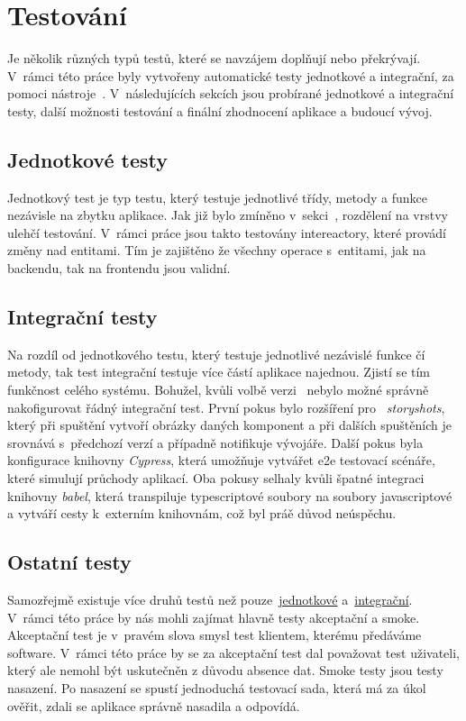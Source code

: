 \chapter{Testování}
\label{ch:testing}
Je několik různých typů testů, které se navzájem doplňují nebo překrývají. V~rámci této práce byly vytvořeny automatické testy jednotkové a integrační, za pomoci nástroje~. V~následujících sekcích jsou probírané jednotkové a integrační testy, další možnosti testování a finální zhodnocení aplikace a budoucí vývoj.

\section{Jednotkové testy}
\label{sc:unit_tests}
Jednotkový test je typ testu, který testuje jednotlivé třídy, metody a funkce nezávisle na zbytku aplikace. Jak již bylo zmíněno v~sekci~, rozdělení na vrstvy ulehčí testování. V~rámci práce jsou takto testovány intereactory, které provádí změny nad entitami. Tím je zajištěno že všechny operace s~entitami, jak na backendu, tak na frontendu jsou validní.

\section{Integrační testy}
\label{sc:integration_tests}
Na rozdíl od jednotkového testu, který testuje jednotlivé nezávislé funkce čí metody, tak test integrační testuje více částí aplikace najednou. Zjistí se tím funkčnost celého systému. Bohužel, kvůli volbě verzi~ nebylo možné správně nakofigurovat řádný integrační test. První pokus bylo rozšíření pro~ \emph{storyshots}, který při spuštění vytvoří obrázky daných komponent a při dalších spuštěních je srovnává s~předchozí verzí a případně notifikuje vývojáře. Další pokus byla konfigurace knihovny \emph{Cypress}, která umožňuje vytvářet \acrfull{e2e} testovací scénáře, které simulují průchody aplikací. Oba pokusy selhaly kvůli špatné integraci knihovny \emph{babel}, která transpiluje typescriptové soubory na soubory javascriptové a vytváří cesty k~externím knihovnám, což byl práě důvod neúspěchu.

\section{Ostatní testy}
Samozřejmě existuje více druhů testů než pouze~\hyperref[sc:unit_tests]{jednotkové} a~\hyperref[sc:integration_tests]{integrační}. V~rámci této práce by nás mohli zajímat hlavně testy akceptační a smoke. Akceptační test je v~pravém slova smysl test klientem, kterému předáváme software. V~rámci této práce by se za akceptační test dal považovat test uživateli, který ale nemohl být uskutečněn z důvodu absence dat. Smoke testy jsou testy nasazení. Po nasazení se spustí jednoduchá testovací sada, která má za úkol ověřit, zdali se aplikace správně nasadila a odpovídá.

